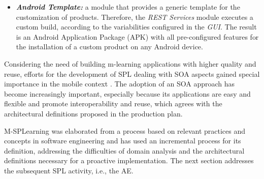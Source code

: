 \begin{itemize}
	\item \textbf{\textit{Android Template:}} a module that provides a generic template for the customization of products. Therefore, the \textit{REST Services} module executes a custom build, according to the variabilities configured in the \textit{GUI}. The result is an Android Application Package (APK) with all pre-configured features for the installation of a custom product on any Android device.
\end{itemize}

Considering the need of building m-learning applications with higher quality and reuse, efforts for the development of SPL dealing with SOA aspects gained special importance in the mobile context \cite{marinho10,nascimento11}. The adoption of an SOA approach has become increasingly important, especially because its applications are easy and flexible and promote interoperability and reuse, which agrees with the architectural definitions proposed in the production plan.

M-SPLear\allowbreak ning was elaborated from a process based on relevant practices and concepts in software engineering and has used an incremental process for its definition, addressing the difficulties of domain analysis and the architectural definitions necessary for a proactive implementation. The next section addresses the subsequent SPL activity, i.e., the AE.

